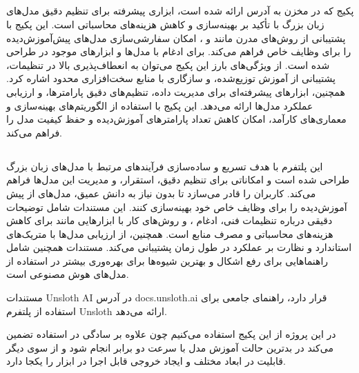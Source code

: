 \documentclass[11pt, a4paper, oneside]{book}
\begin{document}
			\subsection{}
			
				پکیج  که در مخزن  به آدرس  ارائه شده است، ابزاری پیشرفته برای تنظیم دقیق مدل‌های زبان بزرگ با تأکید بر بهینه‌سازی و کاهش هزینه‌های محاسباتی است. این پکیج با پشتیبانی از روش‌های مدرن مانند  و ، امکان سفارشی‌سازی مدل‌های پیش‌آموزش‌دیده را برای وظایف خاص فراهم می‌کند.  برای ادغام با مدل‌ها و ابزارهای موجود در  طراحی شده است. از ویژگی‌های بارز این پکیج می‌توان به انعطاف‌پذیری بالا در تنظیمات، پشتیبانی از آموزش توزیع‌شده، و سازگاری با منابع سخت‌افزاری محدود اشاره کرد. همچنین،  ابزارهای پیشرفته‌ای برای مدیریت داده، تنظیم‌های دقیق پارامتر‌ها، و ارزیابی عملکرد مدل‌ها ارائه می‌دهد. این پکیج با استفاده از الگوریتم‌های بهینه‌سازی و معماری‌های کارآمد، امکان کاهش تعداد پارامترهای آموزش‌دیده و حفظ کیفیت مدل را فراهم می‌کند. \cite{2023xtuner}
			
			\subsection{} \label{Unslot}
			
				این پلتفرم با هدف تسریع و ساده‌سازی فرآیندهای مرتبط با مدل‌های زبان بزرگ طراحی شده است و امکاناتی برای تنظیم دقیق، استقرار، و مدیریت این مدل‌ها فراهم می‌کند.  کاربران را قادر می‌سازد تا بدون نیاز به دانش عمیق، مدل‌های از پیش آموزش‌دیده را برای وظایف خاص خود بهینه‌سازی کنند. این مستندات شامل توضیحات دقیقی درباره تنظیمات فنی، ادغام ، و روش‌های کار با ابزارهایی مانند  برای کاهش هزینه‌های محاسباتی و مصرف منابع است. همچنین،  از ارزیابی مدل‌ها با متریک‌های استاندارد و نظارت بر عملکرد در طول زمان پشتیبانی می‌کند. مستندات  همچنین شامل راهنماهایی برای رفع اشکال و بهترین شیوه‌ها برای بهره‌وری بیشتر در استفاده از مدل‌های هوش مصنوعی است.
				
			مستندات Unsloth AI در آدرس docs.unsloth.ai قرار دارد، راهنمای جامعی برای استفاده از پلتفرم Unsloth ارائه می‌دهد. 
			
			در این پروژه از این پکیج استفاده می‌کنیم چون علاوه بر سادگی در استفاده تضمین می‌کند در بدترین حالت آموزش مدل با سرعت دو برابر انجام شود و از سوی دیگر قابلیت  در ابعاد مختلف و ایجاد خروجی قابل اجرا در ابزار  را یکجا دارد.
		
\end{document}
